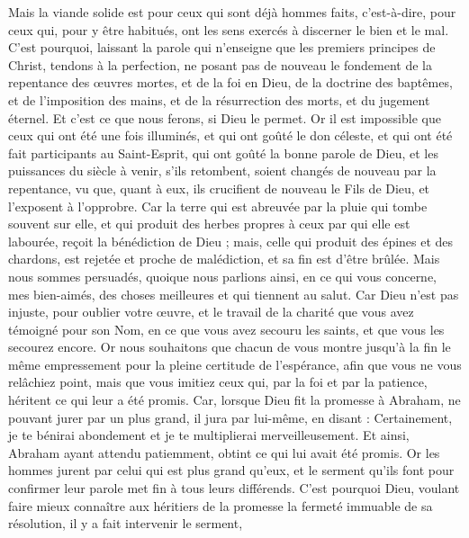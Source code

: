 \begin{multicols}{2}
Mais la viande solide est pour ceux qui sont déjà hommes faits, {c'est-à-dire}, pour ceux qui, pour y être habitués, ont les sens exercés à discerner le bien et le mal.
\VerseOne{}C'est pourquoi, laissant la parole qui n'enseigne que les premiers principes de Christ, tendons à la perfection, ne posant pas de nouveau le fondement de la repentance des œuvres mortes, et de la foi en Dieu,
de la doctrine des baptêmes, et de l'imposition des mains, et de la résurrection des morts, et du jugement éternel.
Et c'est ce que nous ferons, si Dieu le permet.
Or il est impossible que ceux qui ont été une fois illuminés, et qui ont goûté le don céleste, et qui ont été fait participants au Saint-Esprit,
qui ont goûté la bonne parole de Dieu, et les puissances du siècle à venir,
s'ils retombent, soient changés de nouveau par la repentance, vu que, quant à eux, ils crucifient de nouveau le Fils de Dieu, et l'exposent à l'opprobre.
Car la terre qui est abreuvée par la pluie qui tombe souvent sur elle, et qui produit des herbes propres à ceux par qui elle est labourée, reçoit la bénédiction de Dieu ;
mais, celle qui produit des épines et des chardons, est rejetée et proche de malédiction, et sa fin est d'être brûlée.
Mais nous sommes persuadés, quoique nous parlions ainsi, en ce qui vous concerne, mes bien-aimés, des choses meilleures et qui tiennent au salut.
Car Dieu n'est pas injuste, pour oublier votre œuvre, et le travail de la charité que vous avez témoigné pour son Nom, en ce que vous avez secouru les saints, et que vous les secourez encore.
Or nous souhaitons que chacun de vous montre jusqu'à la fin le même empressement pour la pleine certitude de l'espérance,
afin que vous ne vous relâchiez point, mais que vous imitiez ceux qui, par la foi et par la patience, héritent ce qui leur a été promis.
Car, lorsque Dieu fit la promesse à Abraham, ne pouvant jurer par un plus grand, il jura par lui-même,
en disant : Certainement, je te bénirai abondement et je te multiplierai merveilleusement.
Et ainsi, Abraham ayant attendu patiemment, obtint ce qui lui avait été promis.
Or les hommes jurent par celui qui est plus grand qu'eux, et le serment qu'ils font pour confirmer leur parole met fin à tous leurs différends.
C'est pourquoi Dieu, voulant faire mieux connaître aux héritiers de la promesse la fermeté immuable de sa résolution, il y a fait intervenir le serment,

\end{multicols}
